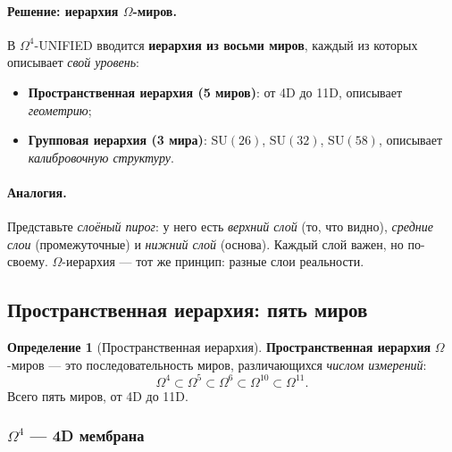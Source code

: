 \documentclass[11pt,a4paper]{article}
\newcommand{\SU}{\mathrm{SU}}
\newcommand{\Om}{\Omega^4}
\newcommand{\Omf}{\Omega^5}
\newcommand{\Oms}{\Omega^6}
\newcommand{\Omt}{\Omega^{10}}
\newcommand{\Ome}{\Omega^{11}}
\theoremstyle{definition}
\newtheorem{definition}[theorem]{Определение}
\begin{document}
\paragraph{Решение: иерархия $\Omega$-миров.}
В $\Om$-UNIFIED вводится \textbf{иерархия из восьми миров}, 
каждый из которых описывает \emph{свой уровень}:
\begin{itemize}
    \item \textbf{Пространственная иерархия (5 миров)}: 
          от 4D до 11D, описывает \emph{геометрию};
    \item \textbf{Групповая иерархия (3 мира)}: 
          $\SU(26)$, $\SU(32)$, $\SU(58)$, описывает 
          \emph{калибровочную структуру}.
\end{itemize}

\paragraph{Аналогия.}
Представьте \emph{слоёный пирог}: у него есть \emph{верхний 
слой} (то, что видно), \emph{средние слои} (промежуточные) и 
\emph{нижний слой} (основа). Каждый слой важен, но по-своему. 
$\Omega$-иерархия --- тот же принцип: разные слои реальности.

\subsection{Пространственная иерархия: пять миров}
\label{subsec:spatial-hierarchy}

\begin{definition}[Пространственная иерархия]
\label{def:spatial-hierarchy}
\textbf{Пространственная иерархия} $\Omega$-миров — это 
последовательность миров, различающихся \emph{числом измерений}:
\begin{equation}
    \Om \subset \Omf \subset \Oms \subset \Omt \subset \Ome.
\end{equation}
Всего пять миров, от 4D до 11D.
\end{definition}

\subsubsection{$\Om$ --- 4D мембрана}
\end{document}
